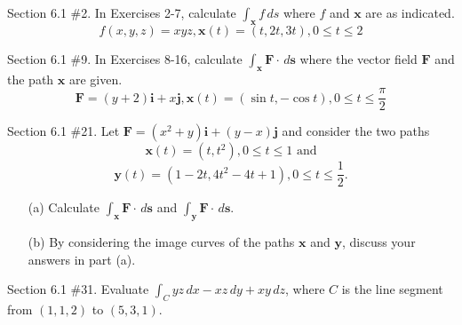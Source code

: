 \documentclass[12pt,letterpaper]{hmcpset}
\begin{document}

\begin{problem}
Section 6.1 \#2. In Exercises 2-7, calculate $\int_{\mathbf{x}} f \,ds$ where $f$ and $\mathbf{x}$ are as indicated.
$$ f(x, y, z) = xyz, \mathbf{x}(t) = (t, 2t, 3t), 0 \leq t \leq 2 $$
\end{problem}

\newpage

\begin{problem}
Section 6.1 \#9. In Exercises 8-16, calculate $\int_{\mathbf{x}} \mathbf{F} \cdot \,d\mathbf{s}$ where the vector field $\mathbf{F}$ and the path $\mathbf{x}$ are given.
$$ \mathbf{F} = (y+2) \mathbf{i} + x \mathbf{j}, \mathbf{x}(t) = (\sin{t}, -\cos{t}), 0 \leq t \leq \frac{\pi}{2} $$
\end{problem}

\newpage

\begin{problem}
Section 6.1 \#21. Let $\mathbf{F} = (x^2 + y) \mathbf{i} + (y - x) \mathbf{j}$ and consider the two paths
$$ \mathbf{x}(t) = (t, t^2), 0 \leq t \leq 1 \text{ and} $$
$$ \mathbf{y}(t) = (1 - 2t, 4t^2 - 4t + 1), 0 \leq t \leq \frac{1}{2}. $$
\begin{enumerate}
	\item[(a)] Calculate $\int_{\mathbf{x}} \mathbf{F} \cdot \,d\mathbf{s}$ and $\int_{\mathbf{y}} \mathbf{F} \cdot \,d\mathbf{s}$.
	\item[(b)] By considering the image curves of the paths $\mathbf{x}$ and $\mathbf{y}$, discuss your answers in part (a).
\end{enumerate}
\end{problem}

\newpage

\begin{problem}
Section 6.1 \#31. Evaluate $ \int_C yz \,dx - xz \,dy + xy \,dz $, where $C$ is the line segment from $(1, 1, 2)$ to $(5, 3, 1)$.
\end{problem}

\newpage
\end{document}
